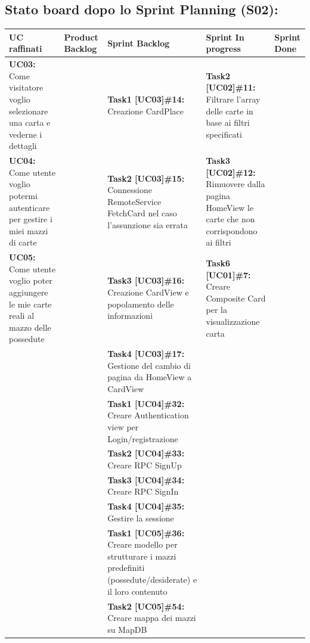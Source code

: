 \begin{landscape}
        \subsection{Stato board dopo lo Sprint Planning (S02):}
        \begin{itemize}
            \small
            \def\arraystretch{2}%
            \begin{tabular}{ | p{6cm} | p{3.2cm} | p{7.8cm} | p{3.6cm} | p{2.2cm}| }
                \hline
                \textbf{UC raffinati}
                & \textbf{Product Backlog}
                & \textbf{Sprint Backlog}
                & \textbf{Sprint In progress}
                & \textbf{Sprint Done} \\
                \hline
                \hline
                \textbf{UC03:}  Come visitatore voglio selezionare una carta e vederne i dettagli
                & & \textbf{Task1 [UC03]\#14:} Creazione CardPlace & \textbf{Task2 [UC02]\#11:} Filtrare l'array delle carte in base ai filtri specificati   & \\
                \hline
                \textbf{UC04:}  Come utente voglio potermi autenticare per gestire i miei mazzi di carte
                &  & \textbf{Task2 [UC03]\#15:} Connessione RemoteService FetchCard nel caso l'assunzione sia errata &  \textbf{Task3 [UC02]\#12:} Rimuovere dalla pagina HomeView le carte che non corrispondono ai filtri & \\
                \hline
                \textbf{UC05:}  Come utente voglio poter aggiungere le mie carte reali al mazzo delle possedute
                &  & \textbf{Task3 [UC03]\#16:} Creazione CardView e popolamento delle informazioni  & \textbf{Task6 [UC01]\#7:}  Creare Composite Card per la visualizzazione carta &\\
                \hline
                & & \textbf{Task4 [UC03]\#17:} Gestione del cambio di pagina da HomeView a CardView & & \\
                \hline
                & & \textbf{Task1 [UC04]\#32:} Creare Authentication view per Login/registrazione  & & \\
                \hline
                & & \textbf{Task2 [UC04]\#33:} Creare RPC SignUp & & \\
                \hline
                & & \textbf{Task3 [UC04]\#34:} Creare RPC SignIn  & & \\
                \hline
                & & \textbf{Task4 [UC04]\#35:} Gestire la sessione  & & \\
                \hline
                & & \textbf{Task1 [UC05]\#36:} Creare modello per strutturare i mazzi predefiniti (possedute/desiderate) e il loro contenuto  & & \\
                \hline
                & & \textbf{Task2 [UC05]\#54:} Creare mappa dei mazzi su MapDB  & & \\


\end{tabular}
\end{itemize}
\end{landscape}

